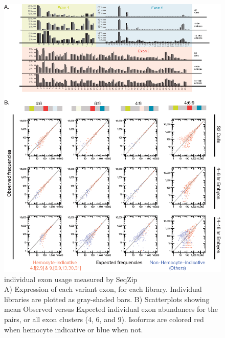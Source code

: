 		\begin{figure} %
		  \centering 
		  \includegraphics{Figures/SeqZipPaper/Roy2014Fig5.eps}
		  \caption[\dscam{} individual exon usage measured by SeqZip]
		  {\dscam{} individual exon usage measured by SeqZip\\[0.25cm]
		    A) Expression of each variant exon, for each library. Individual libraries are plotted as gray-shaded bars. B) Scatterplots showing mean Observed versus Expected individual exon abundances for the pairs, or all exon clusters (4, 6, and 9). Isoforms are colored red when hemocyte indicative or blue when not.
		    }
		  \label{SeqZipPaper:fig:Roy2014 F5}
		  \end{figure}

